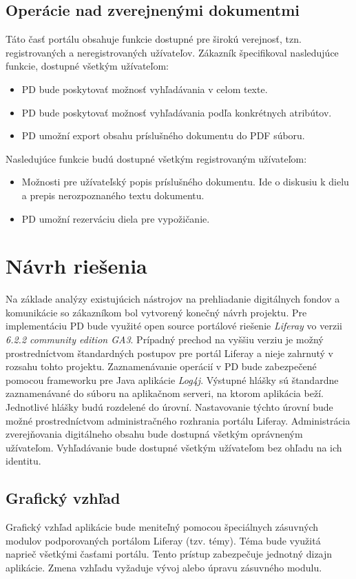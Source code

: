 \documentclass[
  print, %
  table,   %
  lof,     %
  nolot,     %
]{fithesis3}
\begin{document}
\subsection{Operácie nad zverejnenými dokumentmi}
Táto časť portálu obsahuje funkcie dostupné pre širokú verejnosť, tzn. registrovaných a neregistrovaných užívateľov. Zákazník špecifikoval nasledujúce funkcie, dostupné všetkým užívateľom:
\begin{itemize}
	\item PD bude poskytovať možnosť vyhľadávania v celom texte.
	\item PD bude poskytovať možnosť vyhľadávania podľa konkrétnych atribútov.
	\item PD umožní export obsahu príslušného dokumentu do PDF súboru.
\end{itemize}
Nasledujúce funkcie budú dostupné všetkým registrovaným užívateľom:
\begin{itemize}
	\item Možnosti pre užívateľský popis príslušného dokumentu. Ide o diskusiu k dielu a prepis nerozpoznaného textu dokumentu.
	\item PD umožní rezerváciu diela pre vypožičanie.
\end{itemize}
\section{Návrh riešenia}
Na základe analýzy existujúcich nástrojov na prehliadanie digitálnych fondov a komunikácie so zákazníkom bol vytvorený konečný návrh projektu. Pre implementáciu PD bude využité open source
portálové riešenie \textit{Liferay} vo verzii \textit{6.2.2 community edition GA3}. Prípadný prechod na vyššiu verziu je možný prostredníctvom štandardných postupov pre portál Liferay a nieje zahrnutý v rozsahu tohto projektu. Zaznamenávanie operácií v PD bude zabezpečené pomocou frameworku pre Java aplikácie \textit{Log4j}. Výstupné hlášky sú štandardne zaznamenávané do súboru na aplikačnom serveri, na ktorom aplikácia beží. Jednotlivé hlášky budú rozdelené do úrovní. Nastavovanie týchto úrovní bude možné prostredníctvom administračného rozhrania portálu Liferay. Administrácia zverejňovania digitálneho obsahu bude dostupná všetkým oprávneným užívateľom. Vyhľadávanie bude dostupné všetkým užívateľom bez ohľadu na ich identitu.\cite{enterprise-systems}

\subsection{Grafický vzhľad}
Grafický vzhľad aplikácie bude meniteľný pomocou špeciálnych zásuvných modulov podporovaných portálom Liferay (tzv. témy). Téma bude využitá naprieč všetkými časťami portálu. Tento prístup zabezpečuje jednotný dizajn aplikácie. Zmena vzhľadu vyžaduje vývoj alebo úpravu zásuvného modulu.
\end{document}
